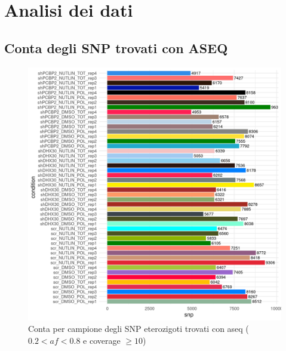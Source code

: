\graphicspath{{chapters/04/media/}}
\chapter{Analisi dei dati}
\label{cha:analisi}
\section{Conta degli SNP trovati con ASEQ}
\label{sec:snp_count}
 \begin{figure}[H]
   \centering
   \includegraphics[scale=1]{aseq_count_2_8_10_pre.png}
	 \caption{Conta per campione degli SNP eterozigoti trovati con aseq ($0.2< af < 0.8$ e coverage $\ge 10$)}
   \label{fig:}
 \end{figure}

